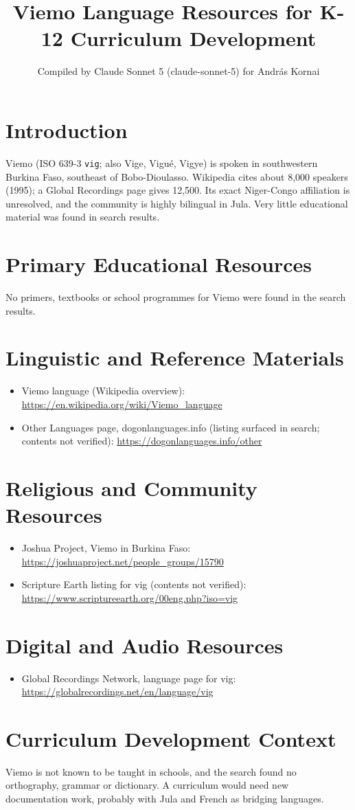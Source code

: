 \documentclass[12pt]{article}
\title{Viemo Language Resources for K-12 Curriculum Development}
\author{Compiled by Claude Sonnet 5 (claude-sonnet-5) for Andr\'as Kornai}
\date{}
\begin{document}
\maketitle

\section{Introduction}
Viemo (ISO 639-3 \texttt{vig}; also Vige, Vigu\'e, Vigye) is spoken in southwestern Burkina Faso, southeast of Bobo-Dioulasso. Wikipedia cites about 8,000 speakers (1995); a Global Recordings page gives 12,500. Its exact Niger-Congo affiliation is unresolved, and the community is highly bilingual in Jula. Very little educational material was found in search results.

\section{Primary Educational Resources}
No primers, textbooks or school programmes for Viemo were found in the search results.

\section{Linguistic and Reference Materials}
\begin{itemize}
\item Viemo language (Wikipedia overview): \url{https://en.wikipedia.org/wiki/Viemo_language}
\item Other Languages page, dogonlanguages.info (listing surfaced in search; contents not verified): \url{https://dogonlanguages.info/other}
\end{itemize}

\section{Religious and Community Resources}
\begin{itemize}
\item Joshua Project, Viemo in Burkina Faso: \url{https://joshuaproject.net/people_groups/15790}
\item Scripture Earth listing for vig (contents not verified): \url{https://www.scriptureearth.org/00eng.php?iso=vig}
\end{itemize}

\section{Digital and Audio Resources}
\begin{itemize}
\item Global Recordings Network, language page for vig: \url{https://globalrecordings.net/en/language/vig}
\end{itemize}

\section{Curriculum Development Context}
Viemo is not known to be taught in schools, and the search found no orthography, grammar or dictionary. A curriculum would need new documentation work, probably with Jula and French as bridging languages.
\end{document}
